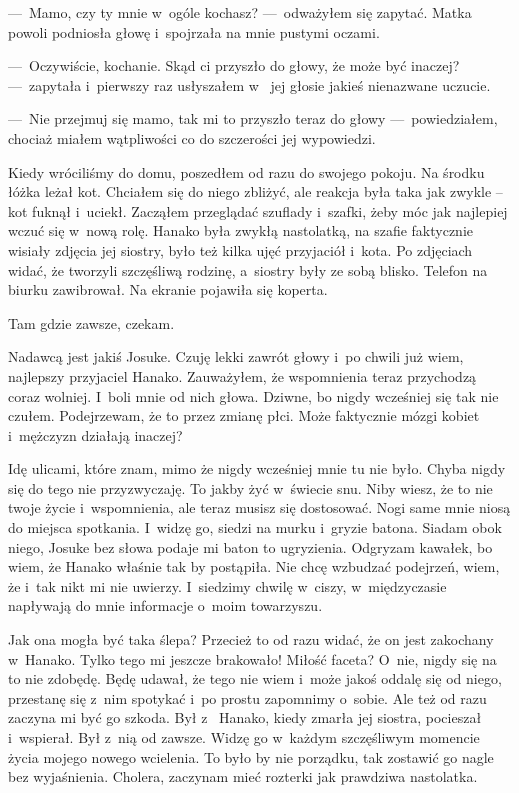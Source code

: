---~Mamo, czy ty mnie w~ogóle kochasz? ---~odważyłem się zapytać. Matka powoli podniosła głowę i~spojrzała na mnie 
pustymi oczami. 

---~Oczywiście, kochanie. Skąd ci przyszło do głowy, że może być inaczej? ---~zapytała i~pierwszy raz usłyszałem w~
jej głosie jakieś nienazwane uczucie. 

---~Nie przejmuj się mamo, tak mi to przyszło teraz do głowy ---~powiedziałem, chociaż miałem wątpliwości co do 
szczerości jej wypowiedzi.

Kiedy wróciliśmy do domu, poszedłem od razu do swojego pokoju. Na środku łóżka leżał kot. Chciałem się do niego 
zbliżyć, ale reakcja była taka jak zwykle -- kot fuknął i~uciekł. Zacząłem przeglądać szuflady i~szafki, żeby móc jak 
najlepiej wczuć się w~nową rolę. Hanako była zwykłą nastolatką, na szafie faktycznie wisiały zdjęcia jej siostry, 
było też kilka ujęć przyjaciół i~kota. Po zdjęciach widać, że tworzyli szczęśliwą rodzinę, a~siostry były ze sobą 
blisko. Telefon na biurku zawibrował. Na ekranie pojawiła się koperta.

\begin{sms}
Tam gdzie zawsze, czekam.
\end{sms}

Nadawcą jest jakiś Josuke. Czuję lekki zawrót głowy i~po chwili już wiem, najlepszy przyjaciel Hanako. Zauważyłem, że 
wspomnienia teraz przychodzą coraz wolniej. I~boli mnie od nich głowa. Dziwne, bo nigdy wcześniej się tak nie czułem. 
Podejrzewam, że to przez zmianę płci. Może faktycznie mózgi kobiet i~mężczyzn działają inaczej?

Idę ulicami, które znam, mimo że nigdy wcześniej mnie tu nie było. Chyba nigdy się do tego nie przyzwyczaję. To jakby 
żyć w~świecie snu. Niby wiesz, że to nie twoje życie i~wspomnienia, ale teraz musisz się dostosować. Nogi same mnie 
niosą do miejsca spotkania. I~widzę go, siedzi na murku i~gryzie batona. Siadam obok niego, Josuke bez słowa podaje 
mi baton to ugryzienia. Odgryzam kawałek, bo wiem, że Hanako właśnie tak by postąpiła. Nie chcę wzbudzać podejrzeń, 
wiem, że i~tak nikt mi nie uwierzy. I~siedzimy chwilę w~ciszy, w~międzyczasie napływają do mnie informacje o~moim 
towarzyszu. 

Jak ona mogła być taka ślepa? Przecież to od razu widać, że on jest zakochany w~Hanako. Tylko tego mi jeszcze 
brakowało! Miłość faceta? O~nie, nigdy się na to nie zdobędę. Będę udawał, że tego nie wiem i~może jakoś oddalę się 
od niego, przestanę się z~nim spotykać i~po prostu zapomnimy o~sobie. Ale też od razu zaczyna mi być go szkoda. Był z~
Hanako, kiedy zmarła jej siostra, pocieszał i~wspierał. Był z~nią od zawsze. Widzę go w~każdym szczęśliwym momencie 
życia mojego nowego wcielenia. To było by nie porządku, tak zostawić go nagle bez wyjaśnienia. Cholera, zaczynam mieć 
rozterki jak prawdziwa nastolatka. 


